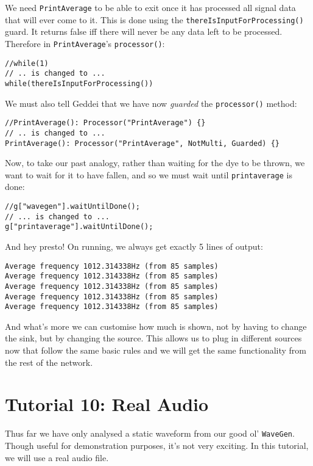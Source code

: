 We need \texttt{PrintAverage} to be able to exit once it has processed all signal data that will ever come to it. This is done using the \texttt{thereIsInputForProcessing()} guard. It returns false iff there will never be any data left to be processed. Therefore in \texttt{PrintAverage}'s \texttt{processor()}:

\begin{verbatim}
//while(1)
// .. is changed to ...
while(thereIsInputForProcessing())
\end{verbatim}

We must also tell Geddei that we have now \textit{guarded} the \texttt{processor()} method:

\begin{verbatim}
//PrintAverage(): Processor("PrintAverage") {}
// .. is changed to ...
PrintAverage(): Processor("PrintAverage", NotMulti, Guarded) {}
\end{verbatim}

Now, to take our past analogy, rather than waiting for the dye to be thrown, we want to wait for it to have fallen, and so we must wait until \texttt{printaverage} is done:

\begin{verbatim}
//g["wavegen"].waitUntilDone();
// ... is changed to ...
g["printaverage"].waitUntilDone();
\end{verbatim}

And hey presto! On running, we always get exactly 5 lines of output:

\begin{verbatim}
Average frequency 1012.314338Hz (from 85 samples)
Average frequency 1012.314338Hz (from 85 samples)
Average frequency 1012.314338Hz (from 85 samples)
Average frequency 1012.314338Hz (from 85 samples)
Average frequency 1012.314338Hz (from 85 samples)
\end{verbatim}

And what's more we can customise how much is shown, not by having to change the sink, but by changing the source. This allows us to plug in different sources now that follow the same basic rules and we will get the same functionality from the rest of the network.




\section{Tutorial 10: Real Audio}

Thus far we have only analysed a static waveform from our good ol' \texttt{WaveGen}. Though useful for demonstration purposes, it's not very exciting. In this tutorial, we will use a real audio file.

